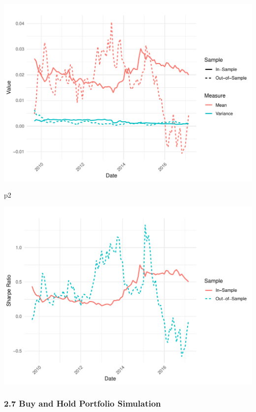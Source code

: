 \documentclass[
  12pt,
]{article}
\newenvironment{Shaded}{\begin{snugshade}}{\end{snugshade}}
\newcommand{\NormalTok}[1]{#1}
\begin{document}
\includegraphics{NDXNES005_A1_RMD_files/figure-latex/unnamed-chunk-17-1.pdf}

\begin{Shaded}
\begin{Highlighting}[]
\NormalTok{p2}
\end{Highlighting}
\end{Shaded}

\includegraphics{NDXNES005_A1_RMD_files/figure-latex/unnamed-chunk-17-2.pdf}

\subsubsection{2.7 Buy and Hold Portfolio
Simulation}\label{buy-and-hold-portfolio-simulation}
\end{document}
